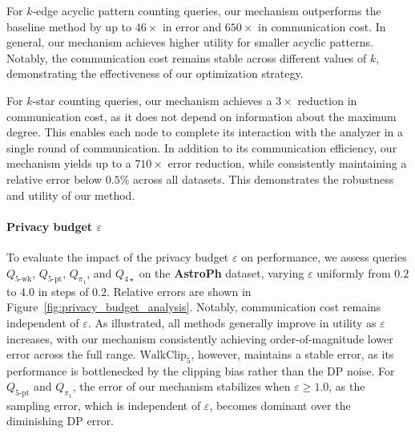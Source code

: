 For $k$-edge acyclic pattern counting queries, our mechanism outperforms the baseline method by up to {$46\times$ in error and $650\times$ in communication cost.
In general, our mechanism achieves higher utility for smaller acyclic patterns.
Notably, the communication cost remains stable across different values of $k$, demonstrating the effectiveness of our optimization strategy.
}



For $k$-star counting queries, our mechanism achieves a $3\times$ reduction in communication cost, as it does not depend on information about the maximum degree. 
This enables each node to complete its interaction with the analyzer in a single round of communication.
In addition to its communication efficiency, our mechanism yields up to {a $710\times$ error reduction,}
while consistently maintaining a relative error below $0.5\%$ across all datasets. 
This demonstrates the robustness and utility of our method.






\paragraph{Privacy budget $\varepsilon$}



 
To evaluate the impact of the privacy budget $\varepsilon$ on performance, we assess queries $Q_{\mathrm{5\text{-}wk}}$, $Q_{\mathrm{5\text{-}pt}}$, $Q_{\pi_1}$, and $Q_{4\star}$ on the \textbf{AstroPh} dataset, varying $\varepsilon$ uniformly from $0.2$ to {$4.0$} in steps of $0.2$.
Relative errors are shown in Figure~\ref{fig:privacy_budget_analysis}.
Notably, communication cost remains independent of $\varepsilon$.
As illustrated, all methods generally improve in utility as $\varepsilon$ increases, with our mechanism consistently achieving order-of-magnitude lower error across the full range. 
{$\mathrm{WalkClip_5}$, however, maintains a stable error, as its performance is bottlenecked by the clipping bias rather than the DP noise.}
For $Q_{\mathrm{5\text{-}pt}}$ and $Q_{\pi_1}$, the error of our mechanism stabilizes when $\varepsilon \geq 1.0$, as the sampling error, which is independent of $\varepsilon$, becomes dominant over the diminishing DP error.



